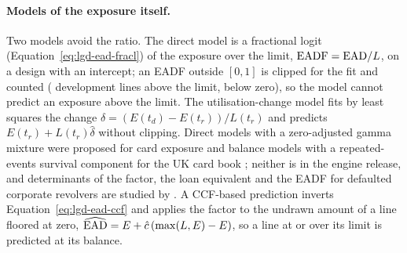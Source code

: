 \paragraph{Models of the exposure itself.} Two models avoid the ratio. The direct model is a fractional logit (Equation~\eqref{eq:lgd-ead-fracl}) of the exposure over the limit, $\mathrm{EADF}=\mathrm{EAD}/L$, on a design with an intercept; an EADF outside $[0,1]$ is clipped for the fit and counted ( development lines above the limit,  below zero), so the model cannot predict an exposure above the limit. The utilisation-change model fits by least squares the change $\delta=(E(t_d)-E(t_r))/L(t_r)$ and predicts $E(t_r)+L(t_r)\hat\delta$ without clipping. Direct models with a zero-adjusted gamma mixture were proposed for card exposure \citep{provisions:tong2016} and balance models with a repeated-events survival component for the UK card book \citep{lgd-ead:leowcrook2013}; neither is in the engine release, and determinants of the factor, the loan equivalent and the EADF for defaulted corporate revolvers are studied by \citet{lgd-ead:jacobs2010}. A CCF-based prediction inverts Equation~\eqref{eq:lgd-ead-ccf} and applies the factor to the undrawn amount of a line floored at zero, $\widehat{\mathrm{EAD}}=E+\hat c\,(\max(L,E)-E)$, so a line at or over its limit is predicted at its balance.

